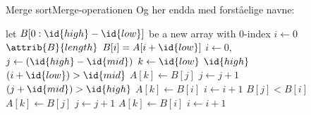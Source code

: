 \documentclass{beamer}
\begin{document}
\begin{frame}{Merge sort}{Merge-operationen}
    Og her endda med forståelige navne:

    \centering
    \begin{minipage}{.8\textwidth}
        \scriptsize
        \begin{tcolorbox}
            
            \vspace{-\abovedisplayskip}
            \begin{codebox}
                \li let $B[0:\id{high}-\id{low}]$ be a new array with 0-index
                \li \For $i \gets 0$ \To $\attrib{B}{length}$ \Do
                    \li $B[i] = A[i+\id{low}]$
                \End
                \zi
                \li $i \gets 0$, $j \gets (\id{high}-\id{mid})$
                \li \For $k \gets \id{low}$ \To $\id{high}$ \Do
                    \li \If $(i + \id{low}) > \id{mid}$ \Then
                        \li $A[k] \gets B[j]$
                        \li $j \gets j + 1$
                    \li \ElseIf $(j + \id{mid}) > \id{high}$ \Then
                        \li $A[k] \gets B[i]$
                        \li $i \gets i + 1$
                    \li \ElseIf $B[j] < B[i]$ \Then
                        \li $A[k] \gets B[j]$
                        \li $j \gets j + 1$
                    \li \Else
                        \li $A[k] \gets B[i]$
                        \li $i \gets i + 1$
                    \End
                \End
            \end{codebox}
        \end{tcolorbox}
    \end{minipage}
\end{frame}
\end{document}
